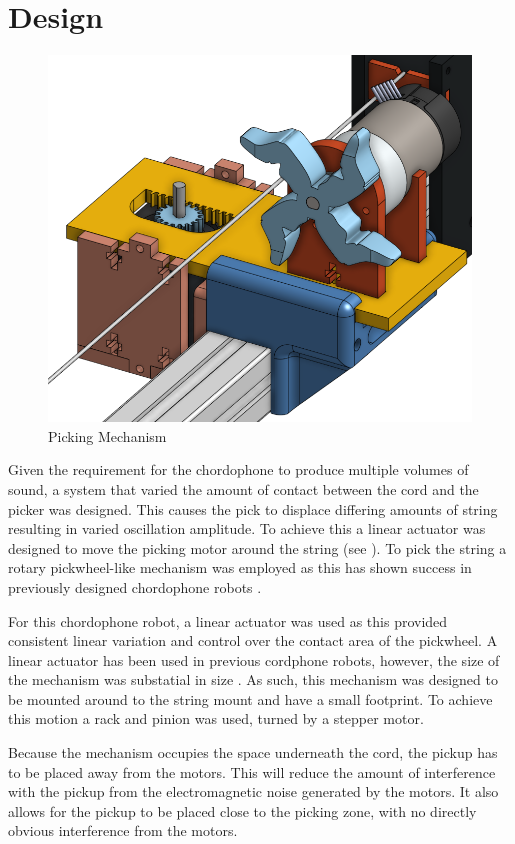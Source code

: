 \documentclass[12pt, a4paper, onecolumn]{IEEEtran}
\begin{document}
    \section{Design}
		\begin{figure}[!h]
			\centering
			\includegraphics[width=0.6\columnwidth]{PickingMechanism.png}
			\caption{Picking Mechanism}
			\label{fig:picking_mechanism}
		\end{figure}

		Given the requirement for the chordophone to produce multiple volumes of sound, a system that varied the amount of contact between the cord and the picker was designed.
		This causes the pick to displace differing amounts of string resulting in varied oscillation amplitude.
		To achieve this a linear actuator was designed to move the picking motor around the string (see ).
		To pick the string a rotary pickwheel-like mechanism was employed as this has shown success in previously designed chordophone robots \cite{VUW_Chordophones}.

		For this chordophone robot, a linear actuator was used as this provided consistent linear variation and control over the contact area of the pickwheel.
		A linear actuator has been used in previous cordphone robots, however, the size of the mechanism was substatial in size \cite{VUW_Chordophones}.
		As such, this mechanism was designed to be mounted around to the string mount and have a small footprint.
		To achieve this motion a rack and pinion was used, turned by a stepper motor.

		Because the mechanism occupies the space underneath the cord, the pickup has to be placed away from the motors.
		This will reduce the amount of interference with the pickup from the electromagnetic noise generated by the motors.
		It also allows for the pickup to be placed close to the picking zone, with no directly obvious interference from the motors.
\end{document}
